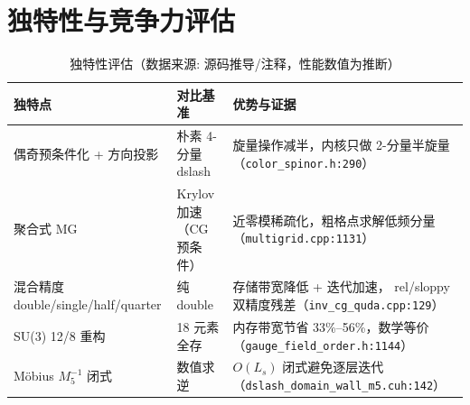 \documentclass[UTF8]{ctexart}
\begin{document}
\section{独特性与竞争力评估}
\begin{table}[htbp]\centering
\begin{tabularx}{\textwidth}{lXX}
\toprule
\textcolor{algo}{独特点} & 对比基准 & 优势与证据 \\
\midrule
偶奇预条件化 + 方向投影 & 朴素 4-分量 dslash & 旋量操作减半，内核只做 2-分量半旋量
（\texttt{color\_spinor.h:290}） \\
聚合式 MG & Krylov 加速（CG 预条件） & 近零模稀疏化，粗格点求解低频分量
（\texttt{multigrid.cpp:1131}） \\
混合精度 double/single/half/quarter & 纯 double & 存储带宽降低 + 迭代加速，
rel/sloppy 双精度残差（\texttt{inv\_cg\_quda.cpp:129}） \\
SU(3) 12/8 重构 & 18 元素全存 & 内存带宽节省 33\%--56\%，数学等价
（\texttt{\nolinkurl{gauge_field_order.h:1144}}） \\
Möbius $M_5^{-1}$ 闭式 & 数值求逆 & $O(L_s)$ 闭式避免逐层迭代
（\texttt{\nolinkurl{dslash_domain_wall_m5.cuh:142}}） \\
\bottomrule
\end{tabularx}
\caption{独特性评估（数据来源: 源码推导/注释，性能数值为推断）}
\end{table}

\end{document}
